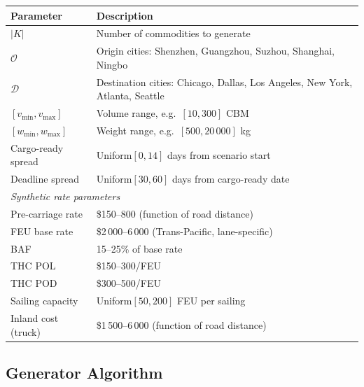 \documentclass[11pt,a4paper]{article}
\theoremstyle{definition}
\begin{document}
\begin{center}
\begin{tabular}{ll}
\toprule
Parameter & Description \\
\midrule
$|K|$ & Number of commodities to generate \\
$\mathcal{O}$ & Origin cities: Shenzhen, Guangzhou, Suzhou, Shanghai, Ningbo \\
$\mathcal{D}$ & Destination cities: Chicago, Dallas, Los Angeles, New York, Atlanta, Seattle \\
$[v_{\min}, v_{\max}]$ & Volume range, e.g.\ $[10, 300]$ CBM \\
$[w_{\min}, w_{\max}]$ & Weight range, e.g.\ $[500, 20\,000]$ kg \\
Cargo-ready spread & Uniform$[0, 14]$ days from scenario start \\
Deadline spread & Uniform$[30, 60]$ days from cargo-ready date \\
\midrule
\multicolumn{2}{l}{\textit{Synthetic rate parameters}} \\
Pre-carriage rate & \$150--800 (function of road distance) \\
FEU base rate & \$2\,000--6\,000 (Trans-Pacific, lane-specific) \\
BAF & 15--25\% of base rate \\
THC POL & \$150--300/FEU \\
THC POD & \$300--500/FEU \\
Sailing capacity & Uniform$[50, 200]$ FEU per sailing \\
Inland cost (truck) & \$1\,500--6\,000 (function of road distance) \\
\bottomrule
\end{tabular}
\end{center}

\subsection{Generator Algorithm}
\end{document}
